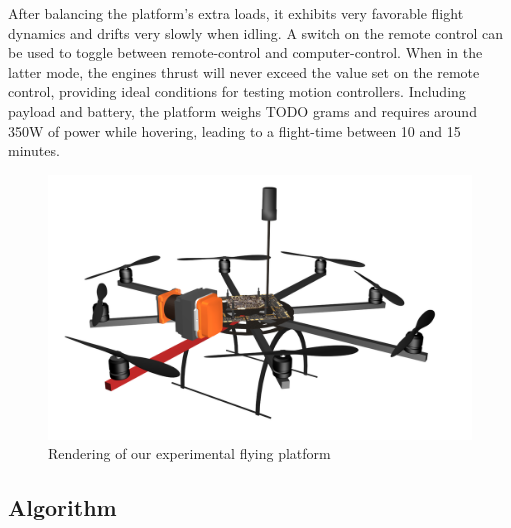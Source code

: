 \documentclass[a4paper, 10pt, conference]{ieeeconf}        %
\begin{document}
After balancing the platform's extra loads, it exhibits very favorable flight dynamics and drifts very slowly when idling. A switch on the remote control can be used to toggle between remote-control and computer-control. When in the latter mode, the engines thrust will never exceed the value set on the remote control, providing ideal conditions for testing motion controllers. Including payload and battery, the platform weighs TODO grams and requires around 350W of power while hovering, leading to a flight-time between 10 and 15 minutes.

\begin{figure}[thpb]
  \centering
  \includegraphics[scale=1.0]{images/oktokopter}
  \caption{Rendering of our experimental flying platform}
  \label{figurelabel}
\end{figure}

\subsection{Algorithm}
\end{document}
